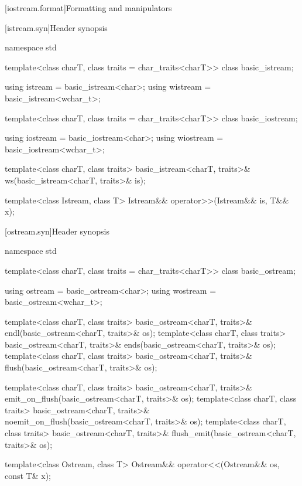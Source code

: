 [iostream.format]{Formatting and manipulators}

[istream.syn]{Header  synopsis}

%
\begin{codeblock}
namespace std {
  template<class charT, class traits = char_traits<charT>>
    class basic_istream;

  using istream  = basic_istream<char>;
  using wistream = basic_istream<wchar_t>;

  template<class charT, class traits = char_traits<charT>>
    class basic_iostream;

  using iostream  = basic_iostream<char>;
  using wiostream = basic_iostream<wchar_t>;

  template<class charT, class traits>
    basic_istream<charT, traits>& ws(basic_istream<charT, traits>& is);

  template<class Istream, class T>
    Istream&& operator>>(Istream&& is, T&& x);
}
\end{codeblock}

%
%
%
%

[ostream.syn]{Header  synopsis}

%
\begin{codeblock}
namespace std {
  template<class charT, class traits = char_traits<charT>>
    class basic_ostream;

  using ostream  = basic_ostream<char>;
  using wostream = basic_ostream<wchar_t>;

  template<class charT, class traits>
    basic_ostream<charT, traits>& endl(basic_ostream<charT, traits>& os);
  template<class charT, class traits>
    basic_ostream<charT, traits>& ends(basic_ostream<charT, traits>& os);
  template<class charT, class traits>
    basic_ostream<charT, traits>& flush(basic_ostream<charT, traits>& os);

  template<class charT, class traits>
    basic_ostream<charT, traits>& emit_on_flush(basic_ostream<charT, traits>& os);
  template<class charT, class traits>
    basic_ostream<charT, traits>& noemit_on_flush(basic_ostream<charT, traits>& os);
  template<class charT, class traits>
    basic_ostream<charT, traits>& flush_emit(basic_ostream<charT, traits>& os);

  template<class Ostream, class T>
    Ostream&& operator<<(Ostream&& os, const T& x);
}
\end{codeblock}

